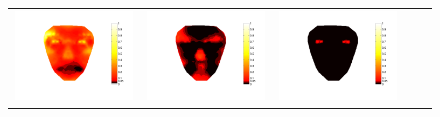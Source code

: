 \documentclass[10pt,journal,compsoc]{IEEEtran}
\begin{document}
\begin{figure}[t!]
\begin{center}%

\begin{tabular}{c c c c c}
 \includegraphics[height=0.5\columnwidth]{fc1-2.pdf}&
  \includegraphics[height=0.5\columnwidth]{fc3-4.pdf}   &\includegraphics[height=0.5\columnwidth]{fc1-3.pdf}&

\end{tabular}
\end{center}
\end{figure}
\end{document}
